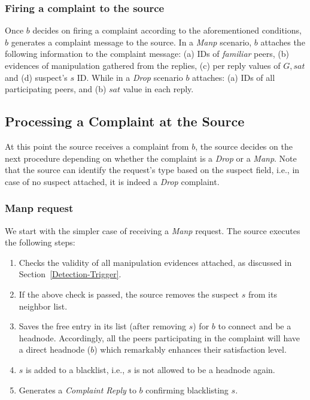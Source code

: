 \subsubsection*{Firing a complaint to the source}

Once $b$ decides on firing a complaint according to the aforementioned conditions, $b$ generates a complaint message to the source.
In a \textit{Manp} scenario, $b$ attaches the following information to the complaint message: (a) IDs of \textit{familiar} peers, (b) evidences of manipulation gathered from the replies, (c) per reply values of $G,sat$ and (d) suspect's $s$ ID.
While in a \textit{Drop} scenario $b$ attaches: (a) IDs of all participating peers, and (b) $sat$ value in each reply.

\subsection{Processing a Complaint at the Source}
\label{complaint_source}
At this point the source receives a complaint from $b$, the source decides on the next procedure depending on whether the complaint is a \textit{Drop} or a \textit{Manp}.
Note that the source can identify the request's type based on the suspect field, i.e., in case of no suspect attached, it is indeed a \textit{Drop} complaint.

\subsubsection*{Manp request}
We start with the simpler case of receiving a \textit{Manp} request. 
The source executes the following steps:
\begin{enumerate}
 \item Checks the validity of all manipulation evidences attached, as discussed in Section~\ref{Detection-Trigger}.
 \item If the above check is passed, the source removes the suspect $s$ from its neighbor list.
 \item Saves the free entry in its list (after removing $s$) for $b$ to connect and be a headnode.
 Accordingly, all the peers participating in the complaint will have a direct headnode ($b$) which remarkably enhances their satisfaction level.
 \item $s$ is added to a blacklist, i.e., $s$ is not allowed to be a headnode again.
 \item Generates a \textit{Complaint Reply} to $b$ confirming blacklisting $s$.
\end{enumerate}

